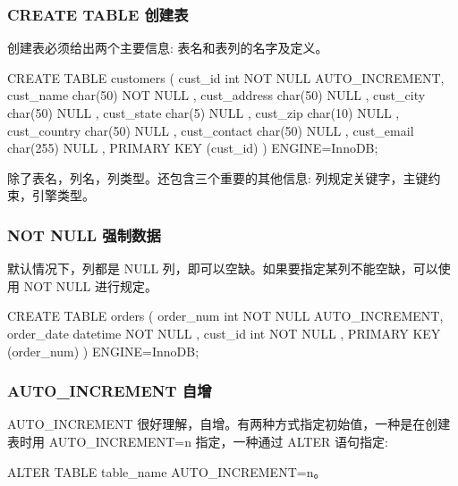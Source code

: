 \subsubsection{CREATE TABLE 创建表}

创建表必须给出两个主要信息: 表名和表列的名字及定义。

\begin{sql}
CREATE TABLE customers (
    cust_id         int         NOT NULL AUTO_INCREMENT,
    cust_name       char(50)    NOT NULL ,
    cust_address    char(50)    NULL ,
    cust_city       char(50)    NULL ,
    cust_state      char(5)     NULL ,
    cust_zip        char(10)    NULL ,
    cust_country    char(50)    NULL ,
    cust_contact    char(50)    NULL ,
    cust_email      char(255)   NULL ,
    PRIMARY KEY (cust_id)
) ENGINE=InnoDB;
\end{sql}

除了表名，列名，列类型。还包含三个重要的其他信息: 列规定关键字，主键约束，引擎类型。


\subsubsection{NOT NULL 强制数据}

默认情况下，列都是 NULL 列，即可以空缺。如果要指定某列不能空缺，可以使用 NOT NULL 进行规定。

\begin{sql}
CREATE TABLE orders (
      order_num  int      NOT NULL AUTO_INCREMENT,
      order_date datetime NOT NULL ,
      cust_id    int      NOT NULL ,
      PRIMARY KEY (order_num)
    ) ENGINE=InnoDB;
\end{sql}

\subsubsection{AUTO\_INCREMENT 自增}

AUTO\_INCREMENT 很好理解，自增。有两种方式指定初始值，一种是在创建表时用 AUTO\_INCREMENT=n 指定，一种通过 ALTER 语句指定: 

\begin{sql}
ALTER TABLE table_name AUTO_INCREMENT=n。
\end{sql}

